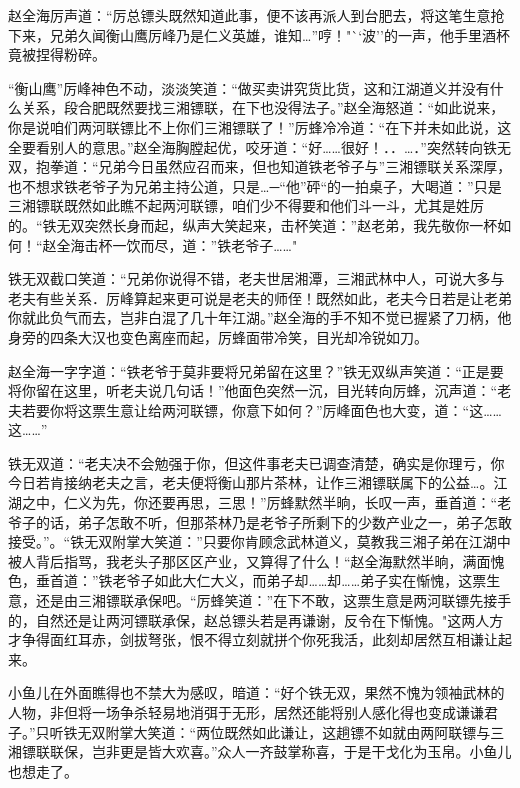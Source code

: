 \documentclass[12pt,oneside]{book}
\begin{document}
赵全海厉声道：``厉总镖头既然知道此事，便不该再派人到台肥去，将这笔生意抢下来，兄弟久闻衡山鹰厉峰乃是仁义英雄，谁知\ldots{}''哼！"``波''的一声，他手里酒杯竟被捏得粉碎。

``衡山鹰''厉峰神色不动，淡淡笑道：``做买卖讲究货比货，这和江湖道义并没有什么关系，段合肥既然要找三湘镖联，在下也没得法子。''赵全海怒道：``如此说来，你是说咱们两河联镖比不上你们三湘镖联了！''厉蜂冷冷道：``在下并未如此说，这全要看别人的意思。''赵全海胸膛起优，咬牙道：``好\ldots\ldots 很好！．．\ldots．''突然转向铁无双，抱拳道：``兄弟今日虽然应召而来，但也知道铁老爷子与''三湘镖联关系深厚，也不想求铁老爷子为兄弟主持公道，只是\ldots─``他''砰``的一拍桌子，大喝道：''只是三湘镖联既然如此瞧不起两河联镖，咱们少不得要和他们斗一斗，尤其是姓厉的。``铁无双突然长身而起，纵声大笑起来，击杯笑道：''赵老弟，我先敬你一杯如何！``赵全海击杯一饮而尽，道：''铁老爷子\ldots\ldots"

铁无双截口笑道：``兄弟你说得不错，老夫世居湘潭，三湘武林中人，可说大多与老夫有些关系．厉峰算起来更可说是老夫的师侄！既然如此，老夫今日若是让老弟你就此负气而去，岂非白混了几十年江湖。''赵全海的手不知不觉已握紧了刀柄，他身旁的四条大汉也变色离座而起，厉蜂面带冷笑，目光却冷锐如刀。

赵全海一字字道：``铁老爷于莫非要将兄弟留在这里？''铁无双纵声笑道：``正是要将你留在这里，听老夫说几句话！''他面色突然一沉，目光转向厉蜂，沉声道：``老夫若要你将这票生意让给两河联镖，你意下如何？''厉峰面色也大变，道：``这\ldots\ldots 这\ldots\ldots{}''

铁无双道：``老夫决不会勉强于你，但这件事老夫已调查清楚，确实是你理亏，你今日若肯接纳老夫之言，老夫便将衡山那片茶林，让作三湘镖联属下的公益\ldots。江湖之中，仁义为先，你还要再思，三思！''厉蜂默然半晌，长叹一声，垂首道：``老爷子的话，弟子怎敢不听，但那茶林乃是老爷子所剩下的少数产业之一，弟子怎敢接受。''。``铁无双附掌大笑道：''只要你肯顾念武林道义，莫教我三湘子弟在江湖中被人背后指骂，我老头子那区区产业，又算得了什么！``赵全海默然半晌，满面愧色，垂首道：''铁老爷子如此大仁大义，而弟子却\ldots\ldots 却\ldots\ldots 弟子实在惭愧，这票生意，还是由三湘镖联承保吧。``厉蜂笑道：''在下不敢，这票生意是两河联镖先接手的，自然还是让两河镖联承保，赵总镖头若是再谦谢，反令在下惭愧。"这两人方才争得面红耳赤，剑拔弩张，恨不得立刻就拼个你死我活，此刻却居然互相谦让起来。

小鱼儿在外面瞧得也不禁大为感叹，暗道：``好个铁无双，果然不愧为领袖武林的人物，非但将一场争杀轻易地消弭于无形，居然还能将别人感化得也变成谦谦君子。''只听铁无双附掌大笑道：``两位既然如此谦让，这趟镖不如就由两阿联镖与三湘镖联联保，岂非更是皆大欢喜。''众人一齐鼓掌称喜，于是干戈化为玉帛。小鱼儿也想走了。
\end{document}
